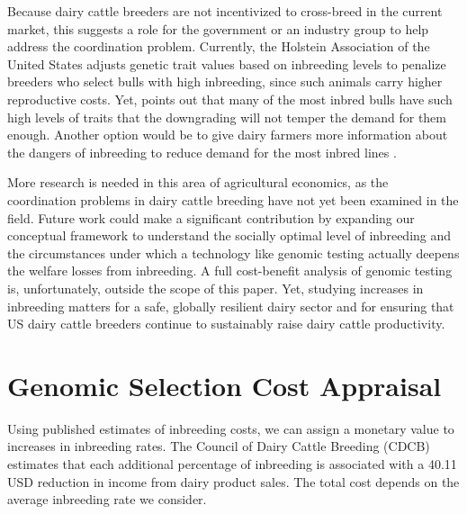 \documentclass[12pt,letterpaper]{article}
\begin{document}
Because dairy cattle breeders are not incentivized to cross-breed in the current market, this suggests a role for the government or an industry group to help address the coordination problem. Currently, the Holstein Association of the United States adjusts genetic trait values based on inbreeding levels to penalize breeders who select bulls with high inbreeding, since such animals carry higher reproductive costs. Yet, \citet{Cole2023} points out that many of the most inbred bulls have such high levels of traits that the downgrading will not temper the demand for them enough. Another option would be to give dairy farmers more information about the dangers of inbreeding to reduce demand for the most inbred lines \citep{Cole2023}.

More research is needed in this area of agricultural economics, as the coordination problems in dairy cattle breeding have not yet been examined in the field. Future work could make a significant contribution by expanding our conceptual framework to understand the socially optimal level of inbreeding and the circumstances under which a technology like genomic testing actually deepens the welfare losses from inbreeding. A full cost-benefit analysis of genomic testing is, unfortunately, outside the scope of this paper. Yet, studying increases in inbreeding matters for a safe, globally resilient dairy sector and for ensuring that US dairy cattle breeders continue to sustainably raise dairy cattle productivity.

\newpage

\clearpage

\appendix

\section{Genomic Selection Cost Appraisal\label{sec:cost}}
Using published estimates of inbreeding costs, we can assign a monetary value to increases in inbreeding rates. The Council of Dairy Cattle Breeding (CDCB) estimates that each additional percentage of inbreeding is associated with a 40.11 USD reduction in income from dairy product sales. The total cost depends on the average inbreeding rate we consider.
 
\end{document}
